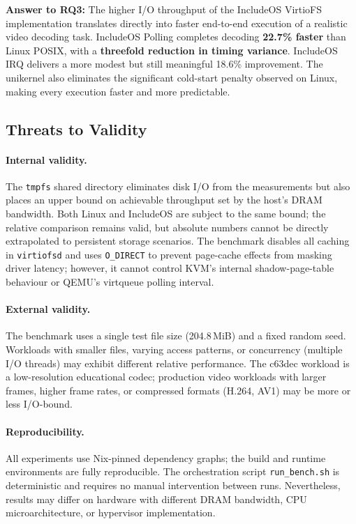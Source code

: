 \textbf{Answer to RQ3:}  The higher I/O throughput of the IncludeOS
VirtioFS implementation translates directly into faster end-to-end
execution of a realistic video decoding task.  IncludeOS Polling
completes decoding \textbf{22.7\% faster} than Linux POSIX, with a
\textbf{threefold reduction in timing variance}.  IncludeOS IRQ delivers
a more modest but still meaningful 18.6\% improvement.  The unikernel
also eliminates the significant cold-start penalty observed on Linux,
making every execution faster and more predictable.

\subsection{Threats to Validity}
\label{sec:threats}

\paragraph{Internal validity.}
The \texttt{tmpfs} shared directory eliminates disk I/O from the
measurements but also places an upper bound on achievable throughput set
by the host's DRAM bandwidth.  Both Linux and IncludeOS are subject to
the same bound; the relative comparison remains valid, but absolute
numbers cannot be directly extrapolated to persistent storage scenarios.
The benchmark disables all caching in \texttt{virtiofsd} and uses
\texttt{O\_DIRECT} to prevent page-cache effects from masking driver
latency; however, it cannot control KVM's internal shadow-page-table
behaviour or QEMU's virtqueue polling interval.

\paragraph{External validity.}
The benchmark uses a single test file size (204.8\,MiB) and a fixed
random seed.  Workloads with smaller files, varying access patterns, or
concurrency (multiple I/O threads) may exhibit different relative
performance.  The c63dec workload is a low-resolution educational codec;
production video workloads with larger frames, higher frame rates, or
compressed formats (H.264, AV1) may be more or less I/O-bound.

\paragraph{Reproducibility.}
All experiments use Nix-pinned dependency graphs; the build and runtime
environments are fully reproducible.  The orchestration script
\texttt{run\_bench.sh} is deterministic and requires no manual
intervention between runs.  Nevertheless, results may differ on hardware
with different DRAM bandwidth, CPU microarchitecture, or hypervisor
implementation.

